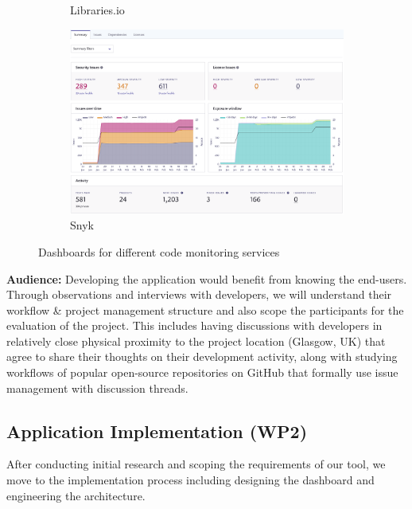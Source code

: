 \documentclass{prrcs}
\begin{document}
\begin{figure}[h]
\begin{subfigure}[b]{0.1\textwidth}
        \caption*{{\footnotesize Libraries.io}}
    \end{subfigure}
    \hfill
    \begin{subfigure}[b]{0.1\textwidth}   
        \centering 
        \includegraphics[width=\textwidth]{snyk_dashboard.png}
        \caption*{{\footnotesize Snyk}}
    \end{subfigure}
    \caption{Dashboards for different code monitoring services}\label{existingSolutions}
\end{figure}

\textbf{Audience:} Developing the application would benefit from knowing the end-users. Through observations and interviews with developers, we will understand their workflow \& project management structure and also scope the participants for the evaluation of the project. This includes having discussions with developers in relatively close physical proximity to the project location (Glasgow, UK) that agree to share their thoughts on their development activity, along with studying workflows of popular open-source repositories on GitHub that formally use issue management with discussion threads.

\subsection*{Application Implementation (WP2)}

After conducting initial research and scoping the requirements of our tool, we move to the implementation process including designing the dashboard and engineering the architecture.
\end{document}
